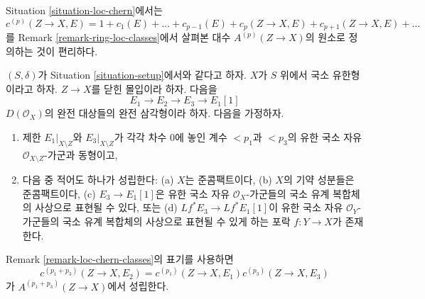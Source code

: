 \begin{remark}
\label{remark-loc-chern-classes}
Situation \ref{situation-loc-chern}에서는
$$
c^{(p)}(Z \to X, E) = 1 + c_1(E) + \ldots + c_{p - 1}(E) +
c_p(Z \to X, E) + c_{p + 1}(Z \to X, E) + \ldots
$$
를 Remark \ref{remark-ring-loc-classes}에서 살펴본 대수
$A^{(p)}(Z \to X)$의 원소로 정의하는 것이 편리하다.
\end{remark}

\begin{lemma}
\label{lemma-additivity-loc-chern-c}
$(S, \delta)$가 Situation \ref{situation-setup}에서와 같다고 하자.
$X$가 $S$ 위에서 국소 유한형이라고 하자. $Z \to X$를
닫힌 몰입이라 하자. 다음을
$$
E_1 \to E_2 \to E_3 \to E_1[1]
$$
$D(\mathcal{O}_X)$의 완전 대상들의 완전 삼각형이라 하자.
다음을 가정하자.
\begin{enumerate}
\item 제한 $E_1|_{X \setminus Z}$와 $E_3|_{X \setminus Z}$가
각각 차수 $0$에 놓인 계수 $< p_1$과 $< p_3$의 유한 국소 자유
$\mathcal{O}_{X \setminus Z}$-가군과 동형이고,
\item 다음 중 적어도 하나가 성립한다:
(a) $X$는 준콤팩트이다,
(b) $X$의 기약 성분들은 준콤팩트이다,
(c) $E_3 \to E_1[1]$은 유한 국소 자유 $\mathcal{O}_X$-가군들의
국소 유계 복합체의 사상으로 표현될 수 있다, 또는
(d) $Lf^*E_3 \to Lf^*E_1[1]$이 유한 국소 자유
$\mathcal{O}_Y$-가군들의 국소 유계 복합체의 사상으로 표현될 수
있게 하는 포락 $f : Y \to X$가 존재한다.
\end{enumerate}
Remark \ref{remark-loc-chern-classes}의 표기를 사용하면
$$
c^{(p_1 + p_3)}(Z \to X, E_2) = c^{(p_1)}(Z \to X, E_1)c^{(p_3)}(Z \to X, E_3)
$$
가 $A^{(p_1 + p_3)}(Z \to X)$에서 성립한다.
\end{lemma}


